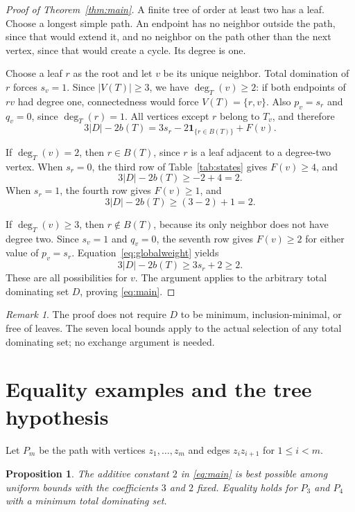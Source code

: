 \documentclass[11pt,a4paper]{article}
\newtheorem{proposition}[theorem]{Proposition}
\theoremstyle{remark}
\newtheorem{remark}[theorem]{Remark}
\newcommand{\BB}{B}
\newcommand{\ind}{\mathbf{1}}
\begin{document}
\begin{proof}[Proof of Theorem~\ref{thm:main}]
A finite tree of order at least two has a leaf. Choose a longest
simple path. An endpoint has no neighbor outside the path, since
that would extend it, and no neighbor on the path other than the
next vertex, since that would create a cycle. Its degree is one.

Choose a leaf $r$ as the root and let $v$ be its unique neighbor.
Total domination of $r$ forces $s_v=1$. Since $|V(T)|\ge 3$,
we have $\deg_T(v)\ge 2$: if both endpoints of $rv$ had degree one,
connectedness would force $V(T)=\{r,v\}$.
Also $p_v=s_r$ and $q_v=0$, since $\deg_T(r)=1$.
All vertices except $r$ belong to $T_v$, and therefore
\begin{equation}\label{eq:globalweight}
 3|D|-2b(T)=3s_r-2\ind_{\{r\in\BB(T)\}}+F(v).
\end{equation}

If $\deg_T(v)=2$, then $r\in\BB(T)$, since $r$ is a leaf adjacent
to a degree-two vertex. When $s_r=0$, the third row of
Table~\ref{tab:states} gives $F(v)\ge 4$, and
\[
 3|D|-2b(T)\ge -2+4=2.
\]
When $s_r=1$, the fourth row gives $F(v)\ge 1$, and
\[
 3|D|-2b(T)\ge (3-2)+1=2.
\]

If $\deg_T(v)\ge 3$, then $r\notin\BB(T)$, because its only
neighbor does not have degree two. Since $s_v=1$ and $q_v=0$,
the seventh row gives $F(v)\ge 2$ for either value of $p_v=s_r$.
Equation~\eqref{eq:globalweight} yields
\[
 3|D|-2b(T)\ge 3s_r+2\ge 2.
\]
These are all possibilities for $v$. The argument applies to the
arbitrary total dominating set $D$, proving \eqref{eq:main}.
\end{proof}

\begin{remark}
The proof does not require $D$ to be minimum, inclusion-minimal, or
free of leaves. The seven local bounds apply to the actual selection
of any total dominating set; no exchange argument is needed.
\end{remark}

\section{Equality examples and the tree hypothesis}
\label{sec:examples}

Let $P_m$ be the path with vertices $z_1,\ldots,z_m$ and edges
$z_i z_{i+1}$ for $1\le i<m$.

\begin{proposition}\label{prop:constant}
The additive constant $2$ in \eqref{eq:main} is best possible among
uniform bounds with the coefficients $3$ and $2$ fixed. Equality
holds for $P_3$ and $P_4$ with a minimum total dominating set.
\end{proposition}
\end{document}
